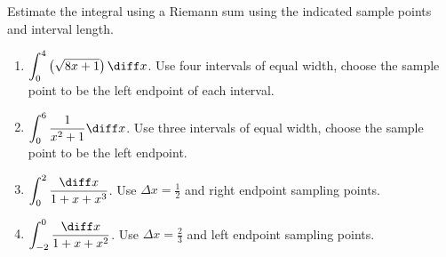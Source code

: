 Estimate the integral using a Riemann sum using the indicated sample points and interval length.
\begin{enumerate}
\item\label{problemRiemannSum-sqrt(8x+1)} $\displaystyle \int_0^4 \left(\sqrt{8x+1}\right)\diff x$. Use four intervals of equal width, choose the sample point to be the left endpoint of each interval. 


\item $\displaystyle \int_0^6 \frac{1}{x^2+1} \diff x$. Use three intervals of equal width, choose the sample point to be the left endpoint. 


\item $\displaystyle\int_{0}^2 \frac{\diff x}{1+x+x^3}$. Use $\Delta x=\frac{1}2 $ and right endpoint sampling points.

\item $\displaystyle\int_{-2}^{0} \frac{\diff x}{1+x+x^2}$. Use $\Delta x=\frac23 $ and left endpoint sampling points.


\end{enumerate}


